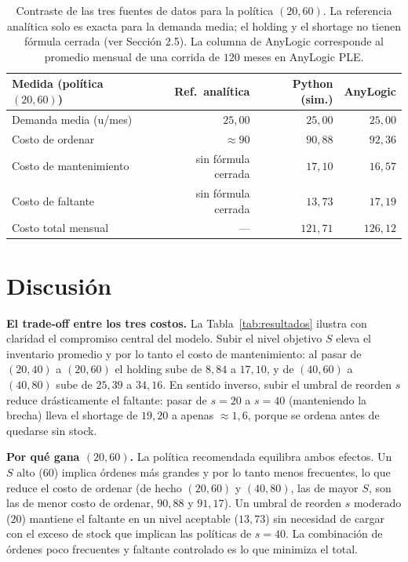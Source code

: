 \documentclass[11pt]{article}
\begin{document}
\begin{table}[H]
\centering
\small
\begin{tabular}{lrrr}
\toprule
\textbf{Medida (pol\'itica $(20, 60)$)} & \textbf{Ref.\ anal\'itica}
& \textbf{Python (sim.)} & \textbf{AnyLogic} \\
\midrule
Demanda media (u/mes) & $25{,}00$           & $25{,}00$           & $25{,}00$ \\
Costo de ordenar      & $\approx 90$        & $90{,}88$           & $92{,}36$ \\
Costo de mantenimiento& sin f\'ormula cerrada & $17{,}10$         & $16{,}57$ \\
Costo de faltante     & sin f\'ormula cerrada & $13{,}73$         & $17{,}19$ \\
Costo total mensual   & ---                 & $121{,}71$          & $126{,}12$ \\
\bottomrule
\end{tabular}
\caption{Contraste de las tres fuentes de datos para la pol\'itica $(20, 60)$.
La referencia anal\'itica solo es exacta para la demanda media; el holding y el
shortage no tienen f\'ormula cerrada (ver Secci\'on 2.5). La columna de AnyLogic
corresponde al promedio mensual de una corrida de $120$ meses en AnyLogic PLE.}
\label{tab:fuentes}
\end{table}

\section{Discusi\'on}

\textbf{El trade-off entre los tres costos.} La Tabla~\ref{tab:resultados}
ilustra con claridad el compromiso central del modelo. Subir el nivel objetivo
$S$ eleva el inventario promedio y por lo tanto el costo de mantenimiento: al
pasar de $(20, 40)$ a $(20, 60)$ el holding sube de $8{,}84$ a $17{,}10$, y de
$(40, 60)$ a $(40, 80)$ sube de $25{,}39$ a $34{,}16$. En sentido inverso,
subir el umbral de reorden $s$ reduce dr\'asticamente el faltante: pasar de
$s = 20$ a $s = 40$ (manteniendo la brecha) lleva el shortage de $19{,}20$ a
apenas $\approx 1{,}6$, porque se ordena antes de quedarse sin stock.

\textbf{Por qu\'e gana $(20, 60)$.} La pol\'itica recomendada equilibra ambos
efectos. Un $S$ alto ($60$) implica \'ordenes m\'as grandes y por lo tanto menos
frecuentes, lo que reduce el costo de ordenar (de hecho $(20, 60)$ y $(40, 80)$,
las de mayor $S$, son las de menor costo de ordenar, $90{,}88$ y $91{,}17$). Un
umbral de reorden $s$ moderado ($20$) mantiene el faltante en un nivel
aceptable ($13{,}73$) sin necesidad de cargar con el exceso de stock que
implican las pol\'iticas de $s = 40$. La combinaci\'on de \'ordenes poco
frecuentes y faltante controlado es lo que minimiza el total.
\end{document}
